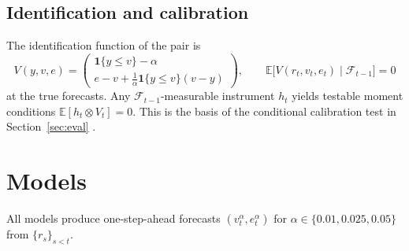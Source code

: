 \documentclass[11pt]{article}
\theoremstyle{remark}
\newcommand{\1}{\mathbf{1}}
\newcommand{\E}{\mathbb{E}}
\newcommand{\F}{\mathcal{F}}
\begin{document}
\subsection{Identification and calibration}
The identification function of the pair is
\begin{equation}\label{eq:ident}
V(y,v,e)=\begin{pmatrix}\1\{y\le v\}-\alpha\\[2pt] e-v+\frac{1}{\alpha}\1\{y\le v\}(v-y)\end{pmatrix},
\qquad \E\bigl[V(r_t,v_t,e_t)\mid\F_{t-1}\bigr]=0
\end{equation}
at the true forecasts. Any $\F_{t-1}$-measurable instrument $h_t$ yields testable moment conditions $\E[h_t\otimes V_t]=0$. This is the basis of the conditional calibration test in Section~\ref{sec:eval} \citep{nolde2017elicitability}.

\section{Models}\label{sec:models}

All models produce one-step-ahead forecasts $(v_t^\alpha,e_t^\alpha)$ for $\alpha\in\{0.01,0.025,0.05\}$ from $\{r_s\}_{s<t}$.
\end{document}
